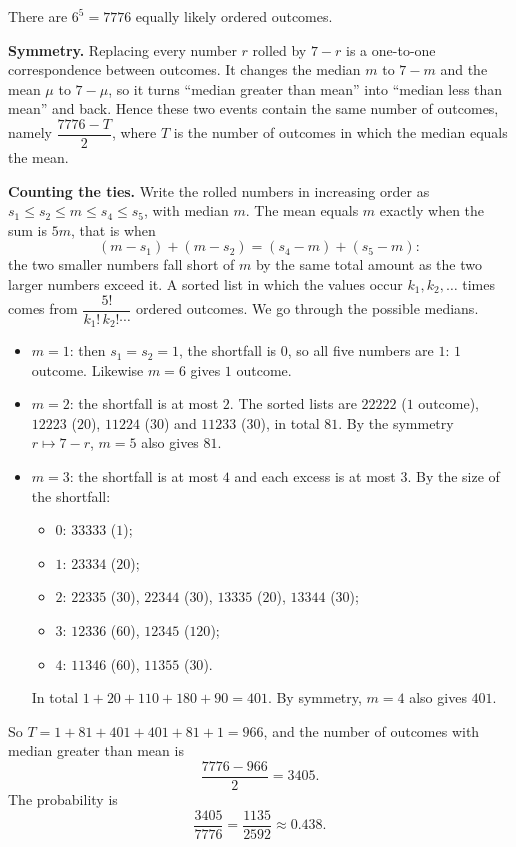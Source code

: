 There are $6^5=7776$ equally likely ordered outcomes.

\textbf{Symmetry.} Replacing every number $r$ rolled by $7-r$ is a one-to-one correspondence between outcomes. It changes the median $m$ to $7-m$ and the mean $\mu$ to $7-\mu$, so it turns ``median greater than mean'' into ``median less than mean'' and back. Hence these two events contain the same number of outcomes, namely $\dfrac{7776-T}{2}$, where $T$ is the number of outcomes in which the median equals the mean.

\textbf{Counting the ties.} Write the rolled numbers in increasing order as $s_1\le s_2\le m\le s_4\le s_5$, with median $m$. The mean equals $m$ exactly when the sum is $5m$, that is when
\[(m-s_1)+(m-s_2)=(s_4-m)+(s_5-m):\]
the two smaller numbers fall short of $m$ by the same total amount as the two larger numbers exceed it. A sorted list in which the values occur $k_1,k_2,\dots$ times comes from $\dfrac{5!}{k_1!\,k_2!\cdots}$ ordered outcomes. We go through the possible medians.
\begin{itemize}
\item $m=1$: then $s_1=s_2=1$, the shortfall is $0$, so all five numbers are $1$: $1$ outcome. Likewise $m=6$ gives $1$ outcome.
\item $m=2$: the shortfall is at most $2$. The sorted lists are $22222$ ($1$ outcome), $12223$ ($20$), $11224$ ($30$) and $11233$ ($30$), in total $81$. By the symmetry $r\mapsto7-r$, $m=5$ also gives $81$.
\item $m=3$: the shortfall is at most $4$ and each excess is at most $3$. By the size of the shortfall:
\begin{itemize}
\item $0$: $33333$ ($1$);
\item $1$: $23334$ ($20$);
\item $2$: $22335$ ($30$), $22344$ ($30$), $13335$ ($20$), $13344$ ($30$);
\item $3$: $12336$ ($60$), $12345$ ($120$);
\item $4$: $11346$ ($60$), $11355$ ($30$).
\end{itemize}
In total $1+20+110+180+90=401$. By symmetry, $m=4$ also gives $401$.
\end{itemize}
So $T=1+81+401+401+81+1=966$, and the number of outcomes with median greater than mean is
\[\dfrac{7776-966}{2}=3405.\]
The probability is
\[\dfrac{3405}{7776}=\boxed{\dfrac{1135}{2592}}\approx0.438.\]
